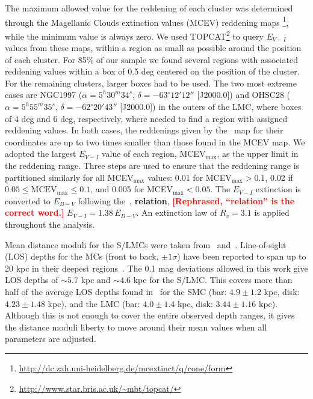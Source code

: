 \documentclass[draft]{aa}
\newcommand{\LEt}[1]{\textcolor{red}{\textbf{[#1]}}}
\begin{document}
The maximum allowed value for the reddening of each cluster was determined
through the Magellanic Clouds extinction values (MCEV) reddening maps
\citep{Haschke_2011}\footnote{\url{
http://dc.zah.uni-heidelberg.de/mcextinct/q/cone/form}}, while
the minimum value is always zero.
%
We used TOPCAT\footnote{\url{http://www.star.bris.ac.uk/~mbt/topcat/}}
to query $E_{V-I}$ values from these maps, within a region as small as possible
around the position of each cluster.
For 85\% of our sample we found several regions with associated reddening
values within a box of 0.5 deg centered on the position of the cluster.
For the remaining clusters, larger boxes had to be used. The two most extreme
cases are NGC1997
($\alpha{=}5^h30^m34^s$, $\delta{=}-63^\circ12'12''$ [J2000.0]) and OHSC28
($\alpha{=}5^h55^m35^s$, $\delta{=}-62^\circ20'43''$ [J2000.0]) in the outers
of the LMC, where boxes of 4 deg and 6 deg, respectively, where needed to find a
region with assigned reddening values. In both cases, the reddenings given by
the~\cite{Schlafly_2011} map for their coordinates are up to two times smaller
than those found in the MCEV map.
%
We adopted the largest $E_{V-I}$ value of each region, MCEV$_{\max}$, as the
upper limit in the reddening range. Three steps are used to ensure that the
reddening range is partitioned similarly for all MCEV$_{\max}$ values: 0.01 for
MCEV$_{\max} {>}0.1$, 0.02 if $0.05{\leq}\mathrm{MCEV}_{\max}{\leq}0.1$, and
0.005 for MCEV$_{\max}{<}0.05$.
%
The $E_{V-I}$ extinction is converted to $E_{B-V}$
following the~\cite{Tammann_2003}, \textbf{relation}, \LEt{Rephrased,
``relation'' is the correct word.} $E_{V-I}{=}1.38\,E_{B-V}$.
An extinction law of $R_v{=}3.1$ is applied throughout the analysis.

Mean distance moduli for the S/LMCs  were taken
from~\cite{de_Grijs_2015} and~\cite{de_Grijs_2014}.
%
Line-of-sight (LOS) depths for the MCs (front to back, $\pm1\sigma$) have been
reported to span up to 20 kpc in their deepest
regions~\citep{Subramanian_2009,Nidever_2013,Scowcroft_2015}.
%
The 0.1 mag deviations allowed in this work give LOS depths of ${\sim}5.7$ kpc
and ${\sim}4.6$ kpc for the S/LMC\@. This covers more than half of the average
LOS depths found in~\cite{Subramanian_2009} for the SMC (bar: $4.9\pm1.2$ kpc,
disk: $4.23\pm1.48$ kpc), and the LMC (bar: $4.0\pm1.4$ kpc, disk: $3.44\pm1.16$
kpc).
Although this is not enough to cover the entire observed depth ranges, it gives
the distance moduli liberty to move around their mean values when all parameters
are adjusted.
\end{document}
